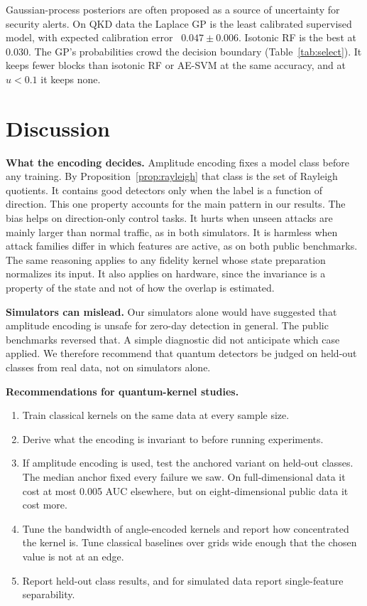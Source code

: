 \documentclass[pdflatex,sn-mathphys-num,lineno]{sn-jnl}
\theoremstyle{thmstyleone}
\begin{document}
Gaussian-process posteriors are often proposed as a source of uncertainty for
security alerts. On QKD data the Laplace GP is the least calibrated supervised
model, with expected calibration error~\cite{guo2017calibration} $0.047\pm0.006$.
Isotonic RF is the best at 0.030. The GP's probabilities crowd the decision
boundary (Table~\ref{tab:select}). It keeps fewer blocks than isotonic RF or AE-SVM
at the same accuracy, and at $u<0.1$ it keeps none.

\section{Discussion}
\label{sec:discussion}

\textbf{What the encoding decides.} Amplitude encoding fixes a model class before
any training. By Proposition~\ref{prop:rayleigh} that class is the set of Rayleigh
quotients. It contains good detectors only when the label is a function of
direction. This one property accounts for the main pattern in our
results. The bias helps on direction-only control tasks. It hurts when unseen
attacks are mainly larger than normal traffic, as in both simulators. It is
harmless when attack families differ in which features are active, as on both
public benchmarks. The same reasoning applies to any fidelity kernel whose state
preparation normalizes its input. It also applies on hardware, since the
invariance is a property of the state and not of how the overlap is estimated.

\textbf{Simulators can mislead.} Our simulators alone would have suggested that
amplitude encoding is unsafe for zero-day detection in general. The public
benchmarks reversed that. A simple diagnostic did not anticipate which case
applied. We therefore recommend that quantum detectors be judged on held-out
classes from real data, not on simulators alone.

\textbf{Recommendations for quantum-kernel studies.}
\begin{enumerate}
\item Train classical kernels on the same data at every sample size.
\item Derive what the encoding is invariant to before running experiments.
\item If amplitude encoding is used, test the anchored variant on held-out
  classes. The median anchor fixed every failure we saw. On full-dimensional data
  it cost at most 0.005 AUC elsewhere, but on eight-dimensional public data it
  cost more.
\item Tune the bandwidth of angle-encoded kernels and report how concentrated the
  kernel is. Tune classical baselines over grids wide enough that the chosen value
  is not at an edge.
\item Report held-out class results, and for simulated data report single-feature
  separability.
\end{enumerate}
\end{document}
